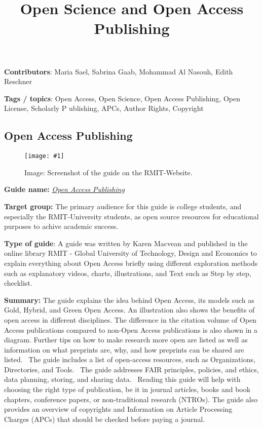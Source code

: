 \documentclass{article}
\newlength{\imgwidth}
\newcommand\scaledgraphics[2]{%
                
\settowidth{\imgwidth}{\texttt{[image: \#1]}}%
                
\setlength{\imgwidth}{\minof{\imgwidth}{#2\textwidth}}%
                
\texttt{[image: \#1]}%
                
}
\begin{document}
\title{Open Science and Open Access Publishing }

\maketitle


\textbf{Contributors}: Maria Sael, Sabrina Gaab, Mohammad Al Nasouh, Edith Reschner


\textbf{Tags / topics}: Open Access, Open Science, Open Access Publishing, Open License, Scholarly P ublishing, APCs, Author Rights, Copyright 


\subsection{Open Access Publishing}\label{H7151279}



\begin{center}
\begin{figure}
\scaledgraphics{dec17709-06cd-4c04-b217-1e1f0b7a42cc.png}{0.75}
\caption*{Image: Screenshot of the guide on the RMIT-Website.}\label{F16639041}
\end{figure}


\end{center}


\textbf{Guide name:} \emph{\href{https://rmit.libguides.com/c.php?g=925407&p=6683526}{Open Access Publishing}} \autocite{macvean_all_2021} 


\textbf{Target group: }The primary audience for this guide is college students, and especially the RMIT-University students, as open source resources for educational purposes to achive academic success.


\textbf{Type of guide}: A guide was written by Karen Macvean and published in the online library RMIT - Global University of Technology, Design and Economics to explain everything about Open Access briefly using different exploration methods such as explanatory videos, charts, illustrations, and Text such as Step by step, checklist. 


\textbf{Summary:} The guide explains the idea behind Open Access, its models such as Gold, Hybrid, and Green Open Access. An illustration also shows the benefits of open access in different disciplines. The difference in the citation volume of Open Access publications compared to non-Open Access publications is also shown in a diagram. Further tips on how to make research more open are listed as well as information on what preprints are, why, and how preprints can be shared are listed.  The guide includes a list of open-access resources, such as Organizations, Directories, and Tools.  The guide addresses FAIR principles, policies, and ethics, data planning, storing, and sharing data.  Reading this guide will help with choosing the right type of publication, be it in journal articles, books and book chapters, conference papers, or non-traditional research (NTROs). The guide also provides an overview of copyrights and Information on Article Processing Charges (APCs) that should be checked before paying a journal.
\end{document}
